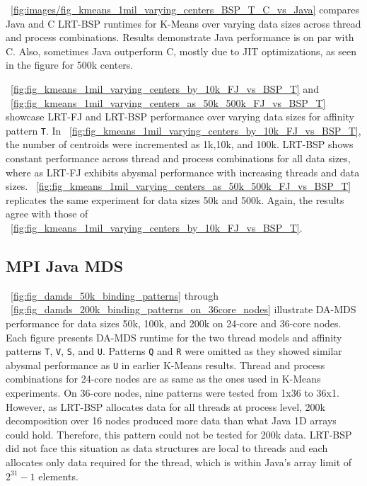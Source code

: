 \documentclass[10pt, conference, compsocconf]{IEEEtran}
\begin{document}
\figurename~\ref{fig:images/fig_kmeans_1mil_varying_centers_BSP_T_C_vs_Java} compares Java and C \ac{LRT-BSP} runtimes for K-Means over varying data sizes across thread and process combinations. Results demonstrate Java performance is on par with C. Also, sometimes Java outperform C, mostly due to \ac{JIT} optimizations, as seen in the figure for 500k centers. 

\figurename~\ref{fig:fig_kmeans_1mil_varying_centers_by_10k_FJ_vs_BSP_T} and \figurename~\ref{fig:fig_kmeans_1mil_varying_centers_as_50k_500k_FJ_vs_BSP_T} showcase \ac{LRT-FJ} and \ac{LRT-BSP} performance over varying data sizes for affinity pattern \texttt{T}. In \figurename~\ref{fig:fig_kmeans_1mil_varying_centers_by_10k_FJ_vs_BSP_T}, the number of centroids were incremented as 1k,10k, and 100k. \ac{LRT-BSP} shows constant performance across thread and process combinations for all data sizes, where as \ac{LRT-FJ} exhibits abysmal performance with increasing threads and data sizes. \figurename~\ref{fig:fig_kmeans_1mil_varying_centers_as_50k_500k_FJ_vs_BSP_T} replicates the same experiment for data sizes 50k and 500k. Again, the results agree with those of \figurename~\ref{fig:fig_kmeans_1mil_varying_centers_by_10k_FJ_vs_BSP_T}.

\subsection{MPI Java \ac{MDS}}
\figurename~\ref{fig:fig_damds_50k_binding_patterns} through \figurename~\ref{fig:fig_damds_200k_binding_patterns_on_36core_nodes} illustrate \ac{DA-MDS} performance for data sizes 50k, 100k, and 200k on 24-core and 36-core nodes. Each figure presents \ac{DA-MDS} runtime for the two thread models and affinity patterns \texttt{T}, \texttt{V}, \texttt{S}, and \texttt{U}. Patterns \texttt{Q} and \texttt{R} were omitted as they showed similar abysmal performance as \texttt{U} in earlier K-Means results. Thread and process combinations for 24-core nodes are as same as the ones used in K-Means experiments. On 36-core nodes, nine patterns were tested from 1x36 to 36x1. However, as \ac{LRT-BSP} allocates data for all threads at process level, 200k decomposition over 16 nodes produced more data than what Java 1D arrays could hold. Therefore, this pattern could not be tested for 200k data. \ac{LRT-BSP} did not face this situation as data structures are local to threads and each allocates only data required for the thread, which is within Java's array limit of $2^{31} - 1$ elements.
\end{document}
